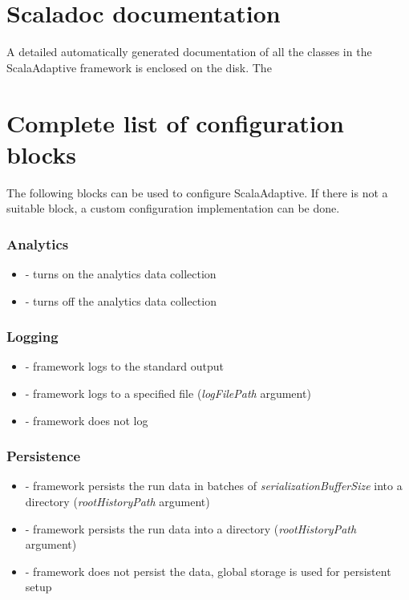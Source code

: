 \documentclass[12pt,a4paper]{report}
\begin{document}
\section{Scaladoc documentation}
\label{attach:scaladoc}

A detailed automatically generated documentation of all the classes in the ScalaAdaptive framework is enclosed on the disk. The 

\section{Complete list of configuration blocks}
\label{attach:config_blocks}

The following blocks can be used to configure ScalaAdaptive. If there is not a suitable block, a custom configuration implementation can be done.

\subsubsection{Analytics}
\begin{itemize}
	\item {} - turns on the analytics data collection
	\item {} - turns off the analytics data collection
\end{itemize}

\subsubsection{Logging}
\begin{itemize}
	\item {} - framework logs to the standard output
	\item {} - framework logs to a specified file (\textit{logFilePath} argument)
	\item {} - framework does not log
\end{itemize}

\subsubsection{Persistence}
\begin{itemize}
	\item {} - framework persists the run data in batches of \textit{serializationBufferSize} into a directory (\textit{rootHistoryPath} argument)
	\item {} - framework persists the run data into a directory (\textit{rootHistoryPath} argument)
	\item {} - framework does not persist the data, global storage is used for persistent setup
\end{itemize}
\end{document}
